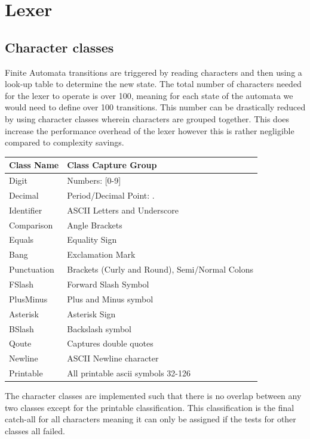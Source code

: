 \documentclass[11pt]{article}
\begin{document}
\newpage
\section{Lexer}
\label{sec:orgd68433d}

\subsection{Character classes}
\label{sec:orgdd5c46b}

Finite Automata transitions are triggered by reading characters and then using a look-up table to determine the new state. The total number of characters needed for the lexer to operate is over 100, meaning for each state of the automata we would need to define over 100 transitions. This number can be drastically reduced by using character classes wherein characters are grouped together. This does increase the performance overhead of the lexer however this is rather negligible compared to complexity savings.

\begin{center}
\begin{tabular}{ll}
Class Name & Class Capture Group\\
\hline
Digit & Numbers: [0-9]\\
Decimal & Period/Decimal Point: .\\
Identifier & ASCII Letters and Underscore\\
Comparison & Angle Brackets\\
Equals & Equality Sign\\
Bang & Exclamation Mark\\
Punctuation & Brackets (Curly and Round), Semi/Normal Colons\\
FSlash & Forward Slash Symbol\\
PlusMinus & Plus and Minus symbol\\
Asterisk & Asterisk Sign\\
BSlash & Backslash symbol\\
Qoute & Captures double quotes\\
Newline & ASCII Newline character\\
Printable & All printable ascii symbols 32-126\\
\end{tabular}
\end{center}

The character classes are implemented such that there is no overlap between any two classes except for the printable classification. This classification is the final catch-all for all characters meaning it can only be assigned if the tests for other classes all failed.
\end{document}

